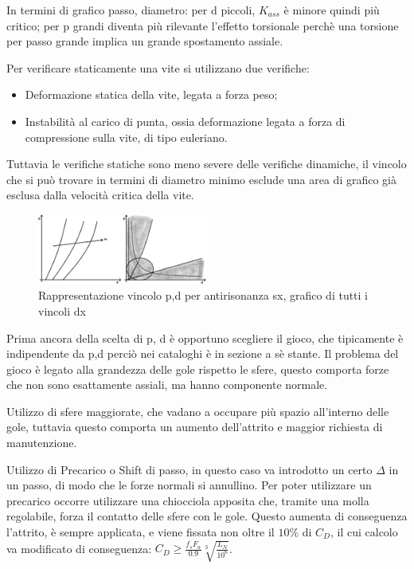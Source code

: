 In termini di grafico passo, diametro: per d piccoli, \( K_{ass} \) è minore quindi più critico; per p grandi diventa più rilevante l'effetto torsionale perchè una torsione per passo grande implica un grande spostamento assiale.

Per verificare staticamente una vite si utilizzano due verifiche:
\begin{itemize}
    \item Deformazione statica della vite, legata a forza peso;
    \item Instabilità al carico di punta, ossia deformazione legata a forza di compressione sulla vite, di tipo euleriano.
\end{itemize}
Tuttavia le verifiche statiche sono meno severe delle verifiche dinamiche, il vincolo che si può trovare in termini di diametro minimo esclude una area di grafico già esclusa dalla velocità critica della vite.

\begin{figure}[h]
    \centering
    \includegraphics[width=0.5\textwidth]{Immagini/vincolo_antirisonanza.png}
    \caption{Rappresentazione vincolo p,d per antirisonanza sx, grafico di tutti i vincoli dx}
\end{figure}

 \label{giocoViti}
Prima ancora della scelta di p, d è opportuno scegliere il gioco, che tipicamente è indipendente da p,d perciò nei cataloghi è in sezione a sè stante.
Il problema del gioco è legato alla grandezza delle gole rispetto le sfere, questo comporta forze che non sono esattamente assiali, ma hanno componente normale.

Utilizzo di sfere maggiorate, che vadano a occupare più spazio all'interno delle gole, tuttavia questo comporta un aumento dell'attrito e maggior richiesta di manutenzione.

Utilizzo di Precarico o Shift di passo, in questo caso va introdotto un certo \(\Delta\) in un passo, di modo che le forze normali si annullino. Per poter utilizzare un precarico occorre utilizzare una chiocciola apposita che, tramite una molla regolabile, forza il contatto delle sfere con le gole. Questo aumenta di conseguenza l'attrito, è sempre applicata, e viene fissata non oltre il \(10\%\) di \(C_D\), il cui calcolo va modificato di conseguenza: \( C_D \geqslant \frac{f_s F_a}{0.9} \sqrt[3]{\frac{L_N}{10^6}} \).

